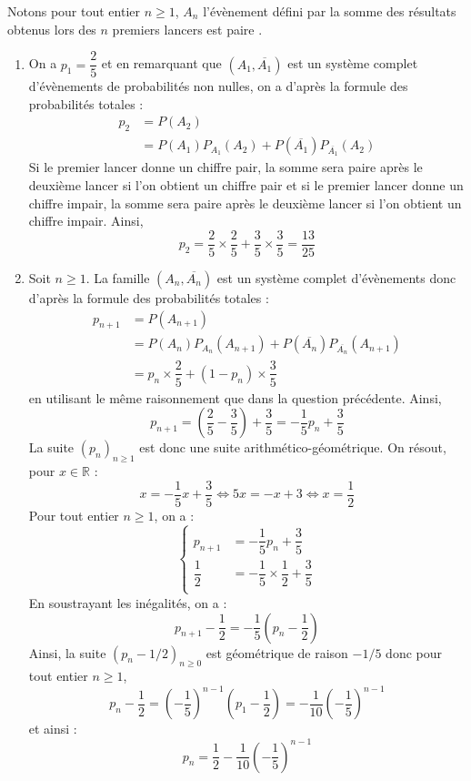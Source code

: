 \documentclass[a4paper,10pt]{report}
\begin{document}
\corr Notons pour tout entier $n \geq 1$, $A_n$ l'évènement défini par \og la somme des résultats obtenus lors des $n$ premiers lancers est paire \fg .

\begin{enumerate}
\item On a $p_1= \dfrac{2}{5}$ et en remarquant que $(A_1, \overline{A_1})$ est un système complet d'évènements de probabilités non nulles, on a d'après la formule des probabilités totales :
\begin{align*}
p_2  & = P(A_2) \\
& = P(A_1)P_{A_1}(A_2) + P(\overline{A_1})P_{\overline{A_1}}(A_2) 
\end{align*}
Si le premier lancer donne un chiffre pair, la somme sera paire après le deuxième lancer si l'on obtient un chiffre pair et si le premier  lancer donne un chiffre impair, la somme sera paire après le deuxième lancer si l'on obtient un chiffre impair. Ainsi,
$$ p_2 = \dfrac{2}{5} \times \dfrac{2}{5} + \dfrac{3}{5} \times \dfrac{3}{5}  = \dfrac{13}{25}$$
\item Soit $n \geq 1$. La famille $(A_n, \overline{A_n})$ est un système complet d'évènements  donc d'après la formule des probabilités totales :
\begin{align*}
p_{n+1}  & = P(A_{n+1}) \\
& = P(A_n)P_{A_n}(A_{n+1}) + P(\overline{A_n})P_{\overline{A_n}}(A_{n+1}) \\
& = p_n \times \dfrac{2}{5} + (1-p_n) \times \dfrac{3}{5}
\end{align*}
en utilisant le même raisonnement que dans la question précédente. Ainsi,
$$ p_{n+1} = \left( \dfrac{2}{5} - \dfrac{3}{5} \right) + \dfrac{3}{5} = - \dfrac{1}{5} p_n + \dfrac{3}{5}$$
La suite $(p_n)_{n \geq 1}$ est donc une suite arithmético-géométrique. On résout, pour $x \in \mathbb{R}$ :
$$ x = - \dfrac{1}{5} x + \dfrac{3}{5} \Longleftrightarrow 5x=-x+3 \Longleftrightarrow x= \dfrac{1}{2}$$
Pour tout entier $n \geq 1$, on a :
$$ \left\lbrace \begin{array}{cl}
p_{n+1} & =  - \dfrac{1}{5} p_n + \dfrac{3}{5} \\[0.3cm]
\dfrac{1}{2} & =  - \dfrac{1}{5} \times \dfrac{1}{2}+ \dfrac{3}{5} \\
\end{array}\right.$$
En soustrayant les inégalités, on a :
$$ p_{n+1} - \dfrac{1}{2} = - \dfrac{1}{5} \left( p_n - \dfrac{1}{2} \right) $$
Ainsi, la suite $(p_n-1/2)_{n \geq 0}$ est géométrique de raison $-1/5$ donc pour tout entier $n \geq 1$,
$$ p_n - \dfrac{1}{2} = \left( - \dfrac{1}{5} \right)^{n-1} \left(p_1 - \dfrac{1}{2} \right) = - \dfrac{1}{10}  \left( - \dfrac{1}{5} \right)^{n-1}$$
et ainsi :
$$ p_n = \dfrac{1}{2} - \dfrac{1}{10}  \left( - \dfrac{1}{5} \right)^{n-1}$$
\end{enumerate}
\end{document}
